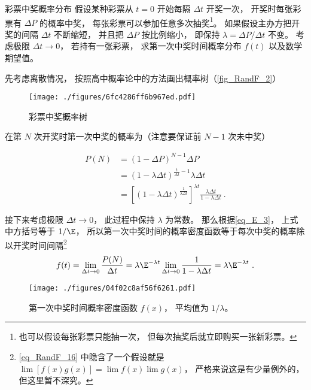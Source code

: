 \begin{example}{彩票中奖概率分布}
假设某种彩票从 $t = 0$ 开始每隔 $\Delta t$ 开奖一次， 开奖时每张彩票有 $\Delta P$ 的概率中奖， 每张彩票可以参加任意多次抽奖\footnote{也可以假设每张彩票只能抽一次， 但每次抽奖后就立即购买一张新彩票。}。 如果假设主办方把开奖的间隔 $\Delta t$ 不断缩短， 并且把 $\Delta P$ 按比例缩小， 即保持 $\lambda = {\Delta P}/{\Delta t}$ 不变。 考虑极限 $\Delta t\to 0$， 若持有一张彩票， 求第一次中奖时间概率分布 $f(t)$ 以及数学期望值。

先考虑离散情况， 按照高中概率论中的方法画出概率树（\autoref{fig_RandF_2}）
\begin{figure}[ht]
\centering
\texttt{[image: ./figures/6fc4286ff6b967ed.pdf]}
\caption{彩票中奖概率树} \label{fig_RandF_2}
\end{figure}
在第 $N$ 次开奖时第一次中奖的概率为（注意要保证前 $N-1$ 次未中奖）

\begin{equation}
\begin{aligned}
P(N) &= (1-\Delta P)^{N-1} \Delta P\\
&= (1-\lambda\Delta t)^{\frac{t}{\Delta t}-1} \lambda\Delta t\\
&= [(1-\lambda\Delta t)^{\frac{1}{\lambda\Delta t}}]^{\lambda t} \frac{\lambda\Delta t}{1-\lambda\Delta t}~.
\end{aligned}
\end{equation}

接下来考虑极限 $\Delta t\to 0$， 此过程中保持 $\lambda$ 为常数。 那么根据\autoref{eq_E_3}， 上式中方括号等于 $1/\E$， 所以第一次中奖时间的概率密度函数等于每次中奖的概率除以开奖时间间隔\footnote{\autoref{eq_RandF_16} 中隐含了一个假设就是 $\lim [f(x)g(x)] = \lim f(x) \lim g(x)$， 严格来说这是有少量例外的， 但这里暂不深究。} %
\begin{equation}\label{eq_RandF_16}
f(t) = \lim_{\Delta t\to 0} \frac{P(N)}{\Delta t} = \lambda\E^{-\lambda t}\lim_{\Delta t\to 0} \frac{1}{1-\lambda\Delta t} = \lambda\E^{-\lambda t}~.
\end{equation}


\begin{figure}[ht]
\centering
\texttt{[image: ./figures/04f02c8af56f6261.pdf]}
\caption{第一次中奖时间概率密度函数 $f(x)$， 平均值为 $1/\lambda$。} \label{fig_RandF_3}
\end{figure}


\end{example}
